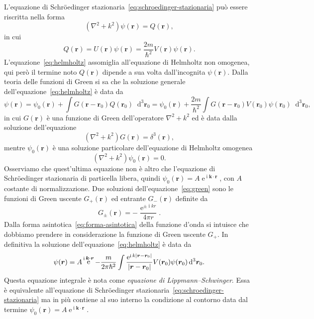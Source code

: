 \documentclass[a4paper,fleqn,twoside,12pt]{article}
\newcommand*{\dd}{\mathop{}\!\mathrm{d}} %
\DeclareMathOperator{\e}{\mathrm{e}} %
\DeclareMathOperator{\uimm}{\mathrm{i}} %
\DeclarePairedDelimiter{\abs}{\lvert}{\rvert}
\begin{document}
L'equazione di Schröedinger stazionaria~\eqref{eq:schroedinger-stazionaria} può
essere riscritta nella forma
\begin{equation}
  \label{eq:helmholtz}
  (\nabla^{2} + k^{2})\psi(\bm{r}) = Q(\bm{r}),
\end{equation}
in cui
\begin{equation}
  Q(\bm{r}) = U(\bm{r})\psi(\bm{r}) =
  \frac{2m}{\hslash^{2}}V(\bm{r})\psi(\bm{r}).
\end{equation}
L'equazione~\eqref{eq:helmholtz} assomiglia all'equazione di Helmholtz non
omogenea, qui però il termine noto $Q(\bm{r})$ dipende a sua volta
dall'incognita $\psi(\bm{r})$.
Dalla teoria delle funzioni di Green si sa che la soluzione generale
dell'equazione~\eqref{eq:helmholtz} è data da
\begin{equation}
  \psi(\bm{r}) = \psi_{0}(\bm{r}) + \int G(\bm{r} -
  \bm{r}_{0})Q(\bm{r}_{0})\dd^{3}\bm{r}_{0} = \psi_{0}(\bm{r}) +
  \frac{2m}{\hslash^{2}}\int G(\bm{r} -
  \bm{r}_{0})V(\bm{r}_{0})\psi(\bm{r}_{0})\dd^{3}\bm{r}_{0},
\end{equation}
in cui $G(\bm{r})$ è una funzione di Green dell'operatore $\nabla^{2} + k^{2}$
ed è data dalla soluzione dell'equazione
\begin{equation}
  \label{eq:green}
  (\nabla^{2} + k^{2})G(\bm{r}) = \delta^{3}(\bm{r}),
\end{equation}
mentre $\psi_{0}(\bm{r})$ è una soluzione particolare dell'equazione di
Helmholtz omogenea
\begin{equation}
  (\nabla^{2} + k^{2})\psi_{0}(\bm{r}) = 0.
\end{equation}
Osserviamo che quest'ultima equazione non è altro che l'equazione di
Schröedinger stazionaria di particella libera, quindi
$\psi_{0}(\bm{r}) = A\e^{\uimm \bm{k}\cdot\bm{r}}$, con $A$ costante di
normalizzazione.  Due soluzioni dell'equazione~\eqref{eq:green} sono le funzioni
di Green uscente $G_{+}(\bm{r})$ ed entrante $G_{-}(\bm{r})$ definite da
\begin{equation}
  G_{\pm}(\bm{r}) = -\frac{\e^{\pm \uimm kr}}{4\pi r}.
\end{equation}
Dalla forma asintotica~\eqref{eq:forma-asintotica} della funzione d'onda si
intuisce che dobbiamo prendere in considerazione la funzione di Green uscente
$G_{+}$.  In definitiva la soluzione dell'equazione~\eqref{eq:helmholtz} è data
da
\begin{equation}
  \label{eq:lippmann-schwinger}
  \psi(\bm{r}) = A\e^{\uimm \bm{k}\cdot\bm{r}} - \frac{m}{2\pi\hslash^{2}}\int
  \frac{\e^{\uimm k\abs{\bm{r} - \bm{r}_{0}}}}{\abs{\bm{r} - \bm{r}_{0}}}
  V(\bm{r}_{0}) \psi(\bm{r}_{0}) \dd^{3}\bm{r}_{0}.
\end{equation}
Questa equazione integrale è nota come \emph{equazione di Lippmann–Schwinger}.
Essa è equivalente all'equazione di Schröedinger
stazionaria~\eqref{eq:schroedinger-stazionaria} ma in più contiene al suo
interno la condizione al contorno data dal termine
$\psi_{0}(\bm{r}) = A\e^{\uimm \bm{k}\cdot\bm{r}}$.
\end{document}
